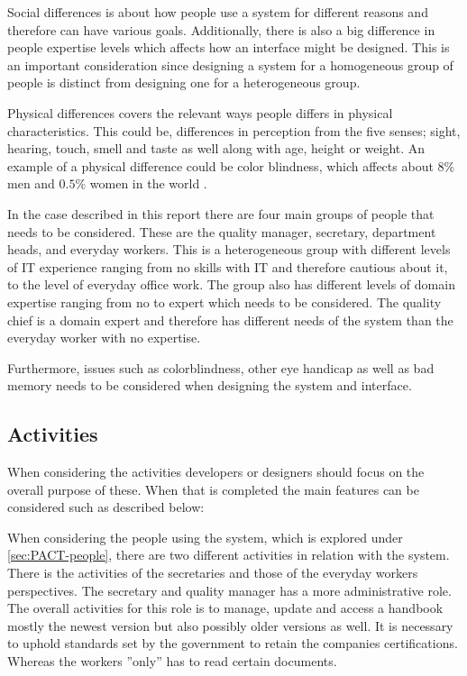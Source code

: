 Social differences is about how people use a system for different reasons and therefore can have various goals.
Additionally, there is also a big difference in people expertise levels which affects how an interface might be designed.
This is an important consideration since designing a system for a homogeneous group of people is  distinct from designing one for a heterogeneous group. \citep{Benyon}

Physical differences covers the relevant ways people differs in physical characteristics.
This could be, differences in perception from the five senses; sight, hearing, touch, smell and taste as well along with age, height or weight. An example of a physical difference could be color blindness, which affects about $8\%$ men and $0.5\%$ women in the world \cite{ColourBlind}.

In the case described in this report there are four main groups of people that needs to be considered. These are the quality manager, secretary, department heads, and everyday workers.
This is a heterogeneous group with different levels of IT experience ranging from no skills with IT and therefore cautious about it, to the level of everyday office work.
The group also has different levels of domain expertise ranging from no to expert which needs to be considered.
The quality chief is a domain expert and therefore has different needs of the system than the everyday worker with no expertise.

Furthermore, issues such as colorblindness, other eye handicap as well as bad memory needs to be considered when designing the system and interface.

\subsection{Activities}\label{PACT-actvities}
When considering the activities developers or designers should focus on the overall purpose of these. When that is completed the main features can be considered such as described below:

When considering the people using the system, which is explored under \cref{sec:PACT-people}, there are two different activities in relation with the system.
There is the activities of the secretaries and those of the everyday workers perspectives.
The secretary and quality manager has a more administrative role.
The overall activities for this role is to manage, update and access a handbook mostly the newest version but also possibly older versions as well.
It is necessary to uphold standards set by the government to retain the companies certifications.
Whereas the workers ''only'' has to read certain documents.

